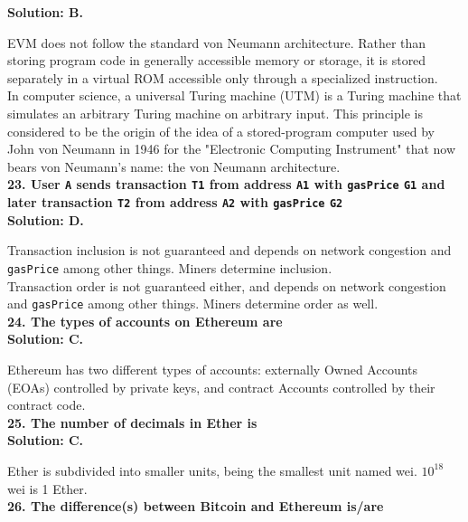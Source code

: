\textbf{Solution: B.}

EVM does not follow the standard von Neumann architecture.
Rather than storing program code in generally accessible memory or storage, it is stored separately in a virtual ROM accessible only through a specialized instruction.\\

In computer science, a universal Turing machine (UTM) is a Turing machine that simulates an arbitrary Turing machine on arbitrary input.
This principle is considered to be the origin of the idea of a stored-program computer used by John von Neumann in 1946 for the "Electronic Computing Instrument" that now bears von Neumann's name: the von Neumann architecture.\\

\textbf{23. User \texttt{A} sends transaction \texttt{T1} from address \texttt{A1} with \texttt{gasPrice} \texttt{G1} and later transaction \texttt{T2} from address \texttt{A2} with \texttt{gasPrice} \texttt{G2}}\label{sec:exam1_q23}\\

\textbf{Solution: D.}

Transaction inclusion is not guaranteed and depends on network congestion and \verb|gasPrice| among other things.
Miners determine inclusion.\\

Transaction order is not guaranteed either, and depends on network congestion and \verb|gasPrice| among other things.
Miners determine order as well.\\

\textbf{24. The types of accounts on Ethereum are}\label{sec:exam1_q24}\\

\textbf{Solution: C.}

Ethereum has two different types of accounts: externally Owned Accounts (EOAs) controlled by private keys, and contract Accounts controlled by their contract code.\\

\textbf{25. The number of decimals in Ether is}\label{sec:exam1_q25}\\

\textbf{Solution: C.}

Ether is subdivided into smaller units, being the smallest unit named wei.
$10^{18}$ wei is 1 Ether.\\

\textbf{26. The difference(s) between Bitcoin and Ethereum is/are}\label{sec:exam1_q26}\\

